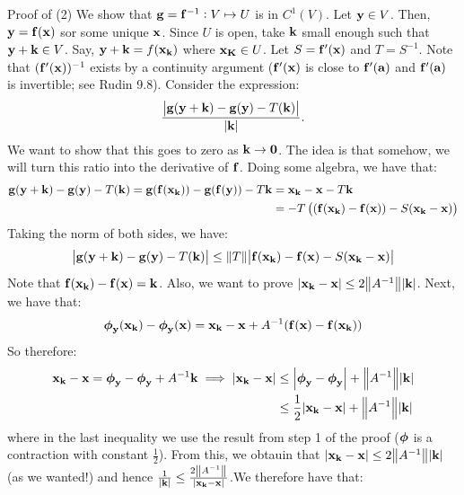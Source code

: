 \begin{nblank}{Proof of (2)}
    We show that $\mathbf{g} = \mathbf{f}^{-1}: V \mapsto U$ is in $C^1(V)$. Let $\mathbf{y} \in V$. Then, $\mathbf{y} = \mathbf{f}(\mathbf{x})$ sor some unique $\mathbf{x}$. Since $U$ is open, take $\mathbf{k}$ small enough such that $\mathbf{y} + \mathbf{k} \in V$. Say, $\mathbf{y} + \mathbf{k} = f(\mathbf{x}_{\mathbf{k}})$ where $\mathbf{x}_{\mathbf{K}} \in U$. Let $S = \mathbf{f}'(\mathbf{x})$ and $T = S^{-1}$. Note that $(\mathbf{f}'(\mathbf{x}))^{-1}$ exists by a continuity argument ($\mathbf{f}'(\mathbf{x})$ is close to $\mathbf{f}'(\mathbf{a})$ and $\mathbf{f}'(\mathbf{a})$ is invertible; see Rudin 9.8). Consider the expression:
    \begin{align*}
        \frac{\abs{\mathbf{g}(\mathbf{y} + \mathbf{k}) - \mathbf{g}(\mathbf{y}) - T(\mathbf{k})}}{\abs{\mathbf{k}}}.
    \end{align*}
    We want to show that this goes to zero as $\mathbf{k} \rightarrow \mathbf{0}$. The idea is that somehow, we will turn this ratio into the derivative of $\mathbf{f}$. Doing some algebra, we have that:
    \begin{align*}
        \mathbf{g}(\mathbf{y} + \mathbf{k}) - \mathbf{g}(\mathbf{y}) - T(\mathbf{k}) = \mathbf{g}(\mathbf{f}(\mathbf{x}_{\mathbf{k}})) - \mathbf{g}(\mathbf{f}(\mathbf{y})) - T\mathbf{k} &= \mathbf{x}_{\mathbf{k}} - \mathbf{x} - T\mathbf{k} 
        \\ &= -T\left((\mathbf{f}(\mathbf{x}_{\mathbf{k}}) - \mathbf{f}(\mathbf{x})) - S(\mathbf{x}_{\mathbf{k}} - \mathbf{x})\right)
    \end{align*}
    Taking the norm of both sides, we have:
    \begin{align*}
        \abs{\mathbf{g}(\mathbf{y} + \mathbf{k}) - \mathbf{g}(\mathbf{y}) - T(\mathbf{k})} \leq \norm{T}\abs{\mathbf{f}(\mathbf{x}_{\mathbf{k}}) - \mathbf{f}(\mathbf{x}) - S(\mathbf{x}_{\mathbf{k}} - \mathbf{x})}
    \end{align*}
    Note that $\mathbf{f}(\mathbf{x}_{\mathbf{k}}) - \mathbf{f}(\mathbf{x}) = \mathbf{k}$. Also, we want to prove $\abs{\mathbf{x}_{\mathbf{k}} - \mathbf{x}} \leq 2\norm{A^{-1}}\abs{\mathbf{k}}$. Next, we have that:
    \begin{align*}
        \mbox{\boldmath$ \phi $}_{\mathbf{y}}(\mathbf{x}_{\mathbf{k}}) - \mbox{\boldmath$ \phi $}_{\mathbf{y}}(\mathbf{x}) = \mathbf{x}_{\mathbf{k}} - \mathbf{x} + A^{-1}(\mathbf{f}(\mathbf{x}) - \mathbf{f}(\mathbf{x}_{\mathbf{k}}))
    \end{align*}
    So therefore:
    \begin{align*}
        \mathbf{x}_{\mathbf{k}} - \mathbf{x} = \mbox{\boldmath$ \phi $}_{\mathbf{y}} - \mbox{\boldmath$ \phi $}_{\mathbf{y}} + A^{-1}\mathbf{k} \implies \abs{\mathbf{x}_{\mathbf{k}} - \mathbf{x}} &\leq \abs{\mbox{\boldmath$ \phi $}_{\mathbf{y}} - \mbox{\boldmath$ \phi $}_{\mathbf{y}}} + \norm{A^{-1}}\abs{\mathbf{k}}
        \\ &\leq \frac{1}{2}\abs{\mathbf{x}_{\mathbf{k}} - \mathbf{x}} + \norm{A^{-1}}\abs{\mathbf{k}}
    \end{align*}
    where in the last inequality we use the result from step 1 of the proof ($\mbox{\boldmath$ \phi $}$ is a contraction with constant $\frac{1}{2}$). From this, we obtauin that $\abs{\mathbf{x}_{\mathbf{k}} - \mathbf{x}} \leq 2\norm{A^{-1}}\abs{\mathbf{k}}$ (as we wanted!) and hence $\frac{1}{\abs{\mathbf{k}}} \leq \frac{2\norm{A^{-1}}}{\abs{\mathbf{x}_{\mathbf{k}} - \mathbf{x}}}$.We therefore have that:

\end{nblank}
